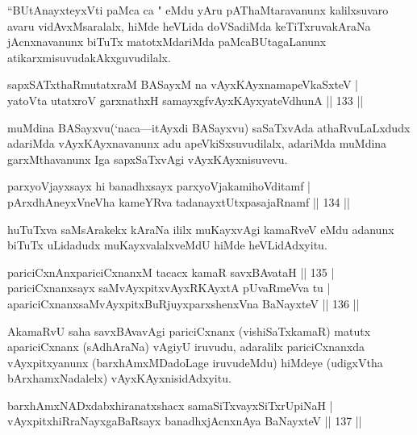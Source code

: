 \begin{artha}
``BUtAnayxteyxVti paMca ca " eMdu yAru pAThaMtaravanunx kalilxsuvaro avaru vidAvxMsaralalx, hiMde heVLida doVSadiMda keTiTxruvakAraNa jAcnxnavanunx biTuTx matotxMdariMda paMcaBUtagaLanunx atikarxmisuvudakAkxguvudilalx.
\end{artha}

\begin{shl}
sapxSATxthaRmutatxraM BASayxM na vAyxKAyxnamapeVkaSxteV |\\
yatoV\s ta utatxroV garxnathxH samayxgfvAyxKAyxyateV\s dhunA \hfill || 133 ||
\end{shl}

\begin{artha}
muMdina BASayxvu(`naca---itAyxdi BASayxvu) saSaTxvAda athaRvuLaLxdudx adariMda vAyxKAyxnavanunx adu apeVkiSxsuvudilalx, adariMda muMdina garxMthavanunx Iga sapxSaTxvAgi vAyxKAyxnisuvevu.
\end{artha}

\begin{shl}
parxyoVjayxsayx hi banadhxsayx parxyoVjakamihoVditamf |\\
pArxdhAneyxVneVha kameYRva tadanayxtUtxpasajaRnamf \hfill || 134 ||
\end{shl}

\begin{artha}
huTuTxva saMsArakekx kAraNa ililx muKayxvAgi kamaRveV eMdu adanunx biTuTx uLidadudx muKayxvalalxveMdU hiMde heVLidAdxyitu.
\end{artha}

\begin{shl}
pariciCxnAnxpariciCxnanxM tacacx kamaR savxBAvataH \hfill || 135 |\\
pariciCxnanxsayx saMvAyxpitxvAyxRKAyxtA pUvaRmeVva tu |\\
apariciCxnanxsaMvAyxpitxBuRjuyxparxshenxVna BaNayxteV \hfill || 136 ||
\end{shl}

\begin{artha}
AkamaRvU saha savxBAvavAgi pariciCxnanx (vishiSaTxkamaR) matutx apariciCxnanx  (sAdhAraNa) vAgiyU iruvudu, adaralilx pariciCxnanxda vAyxpitxyanunx (barxhAmxMDadoLage iruvudeMdu) hiMdeye (udigxVtha bArxhamxNadalelx) vAyxKAyxnisidAdxyitu.
\end{artha}


\begin{shl}
barxhAmxNADxdabxhiranatxshacx samaSiTxvayxSiTxrUpiNaH |\\
vAyxpitxhiRraNayxgaBaRsayx banadhxjAcnxnAya BaNayxteV \hfill || 137 ||
\end{shl}

